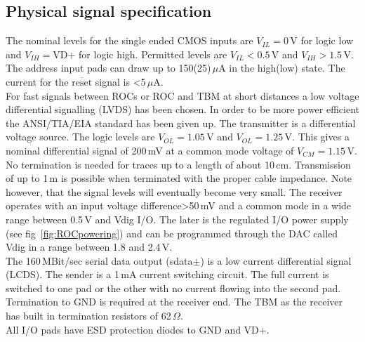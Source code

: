\subsection{Physical signal specification}
The nominal levels for the single ended CMOS inputs are $V_{IL}=0$\,V for logic low and $V_{IH}=$VD+ for logic high. Permitted levels are $V_{IL}<0.5$\,V and $V_{IH}>1.5$\,V. The address input pads can draw up to 150(25)\,$\mu$A in the high(low) state. The current for the $\overline{\mathrm{reset}}$ signal is <5\,$\mu$A.\\ 
For fast signals between ROCs or ROC and TBM at short distances a low voltage differential signalling (LVDS) has been chosen. In order to be more power efficient the ANSI/TIA/EIA standard has been given up. The transmitter is a differential voltage source. The logic levels are $V_{OL}=1.05$\,V and $V_{OL}=1.25$\,V. This gives a nominal differential signal of 200\,mV at a common mode voltage of $V_{CM}=1.15$\,V. No termination is needed for traces up to a length of about 10\,cm. Transmission of up to 1\,m is possible when terminated with the proper cable impedance. Note however, that the signal levels will eventually become very small. The receiver operates with an input voltage difference>50\,mV and a common mode in a wide range between 0.5\,V and Vdig I/O. The later is the regulated I/O power supply (see fig~\ref{fig:ROCpowering}) and can be programmed through the DAC called Vdig in a range between 1.8 and 2.4\,V.\\
The 160\,MBit/sec serial data output (sdata$\pm$) is a low current differential signal (LCDS). The sender is a 1\,mA current switching circuit. The full current is switched to one pad or the other with no current flowing into the second pad. Termination to GND is required at the receiver end. The TBM as the receiver has built in termination resistors of 62\,$\Omega$.\\
All I/O pads have ESD protection diodes to GND and VD+. 
